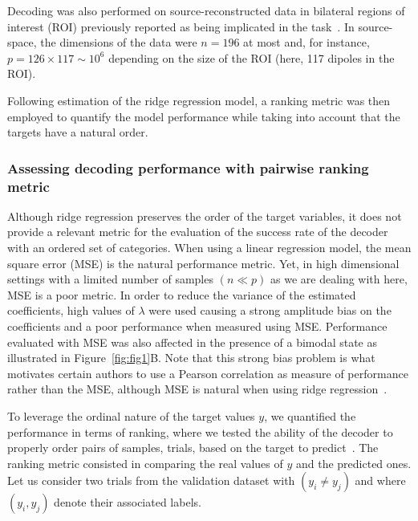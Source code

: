 Decoding was also performed on source-reconstructed data in bilateral regions of interest (ROI) previously reported as being implicated in the task~\cite{23zilber2014supramodal}. In source-space, the dimensions of the data were $n=196$ at most and, for instance, $p=126\times 117 \sim 10^6$ depending on the size of the ROI (here, 117 dipoles in the ROI).

Following estimation of the ridge regression model, a ranking metric was then employed to quantify the model performance while taking into account that the targets have a natural order.

\subsubsection*{Assessing decoding performance with pairwise ranking metric}
Although ridge regression preserves the order of the target variables, it does not provide a relevant metric for the evaluation of the success rate of the decoder with an ordered set of categories. When using a linear regression model, the mean square error (MSE) is the natural performance metric. Yet, in high dimensional settings with a limited number of samples $(n\ll p)$ as we are dealing with here, MSE is a poor metric. In order to reduce the variance of the estimated coefficients, high values of $\lambda$ were used causing a strong amplitude bias on the coefficients and a poor performance when measured using MSE. Performance evaluated with MSE was also affected in the presence of a bimodal state as illustrated in Figure~\ref{fig:fig1}B. Note that this strong bias problem is what motivates certain authors to use a Pearson correlation as measure of performance rather than the MSE, although MSE is natural when using ridge regression~\cite{kay2008}.

To leverage the ordinal nature of the target values $y$, we quantified the performance in terms of ranking, where we tested the ability of the decoder to properly order pairs of samples, trials, based on the target to predict~\cite{herbrich00ordinal,Joachims:2002}. The ranking metric consisted in comparing the real values of $y$ and the predicted ones.
Let us consider two trials from the validation dataset with $(y_i \neq y_j)$ and where $(y_i, y_j)$ denote their associated labels.

